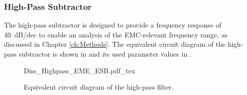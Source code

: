 \subsubsection*{High-Pass Subtractor}
The high-pass subtractor is designed to provide a frequency response of \SI{+40}{dB/dec} to enable an analysis of the EMC-relevant frequency range, as discussed in Chapter \ref{ch:Methods}.
The equivalent circuit diagram of the high-pass subtractor is shown in  and its used parameter values in .

\begin{figure}[ht]
	\centering
	{Diss_Highpass_EME_ESB.pdf_tex}
	\caption{Equivalent circuit diagram of the high-pass filter.}\label{fig:EME_ESB_HP}
\end{figure}

